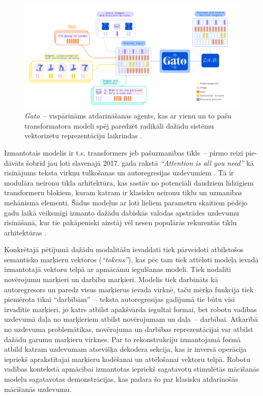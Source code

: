 \documentclass[12pt, a4paper]{article}
\numberwithin{equation}{section} %
\begin{document}
\begin{figure}[t!]
    \centering
    \includegraphics[width=16cm,page=1]{../img/gato.png}
    \caption{\textit{Gato}~-- vispārināms atdarināšanas aģents, kas ar vienu un to pašu transformatora modeli spēj paredzēt radikāli dažādu sistēmu vektorizētu reprezentāciju laikrindas \cite{reed2022generalist}.}
\end{figure}

Izmantotais modelis ir t.s. transformers jeb pašuzmanības tīkls~-- pirmo reizi pie-dāvāts šobrīd jau ļoti slavenajā 2017. gada rakstā \textit{``Attention is all you need''} kā risinājums teksta virkņu tulkošanas un autoregresijas uzdevumiem \cite{vaswani2017attention}. Tā ir modulāra neironu tīkla arhitektūra, kas sastāv no potenciāli daudziem līdzīgiem transformeru blokiem, kuram katram ir klasisku neironu tīklu un uzmanības mehānisma elementi. Šādus modeļus ar ļoti lieliem parametru skaitiem pēdējo gadu laikā veiksmīgi izmanto dažādu dabiskās valodas apstrādes uzdevumu risināšanā, kur tie pakāpeniski aizstāj vēl nesen populārās rekurentās tīklu arhitektūras \cite{radford2018improving}.

Konkrētajā pētījumā dažādu modalitāšu ievaddati tiek pārveidoti atbilstošos semantisko marķieru vektoros (\textit{``tokens''}), kas pēc tam tiek attēloti modeļa ievadā izmantotajā vektoru telpā ar apmācāmu iegulšanas modeli. Tiek nodalīti novērojumu marķieri un darbību marķieri. Modelis tiek darbināts kā autoregresors un paredz visus marķierus ievada virknē, taču mērķa funkcija tiek piemērota tikai ``darbībām''~-- teksta autoregresijas gadījumā tie būtu visi izvadītie marķieri, jo katrs atbilst apakšvārda iegultai formai, bet robotu vadības uzdevumā daļa no marķieriem atbilst novērojumam un daļa~-- darbībai. Atkarībā no uzdevuma problemātikas, novērojuma un darbības reprezentācijai var atbilst dažādu garumu marķieru virknes. Par to rekonstrukciju izmantojamā formā atbild katram uzdevumam atsevišķa dekodera sekcija, kas ir inversā operācija iepriekš aprakstītajai marķieru kodēšanai un attēlošanai vektoru telpā. Robotu vadības kontekstā apmācībai izmantotas iepriekš sagatavotu stimulētās mācīšanās modeļu sagatavotas demonstrācijas, kas padara šo par klasisku atdarinošās mācīšanās uzdevumu. 
\end{document}
